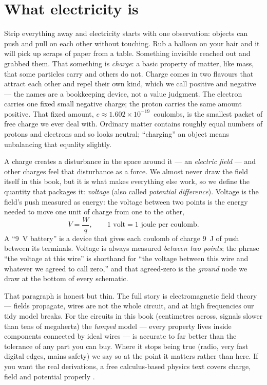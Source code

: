 \section{What electricity is}
\label{sec:charge}

Strip everything away and electricity starts with one observation: objects can
push and pull on each other without touching. Rub a balloon on your hair and it
will pick up scraps of paper from a table. Something invisible reached out and
grabbed them. That something is \emph{charge}: a basic
property of matter, like mass, that some particles carry and others do not.
Charge comes in two flavours that attract each other and repel their own kind,
which we call positive and negative — the names are a bookkeeping device, not a
value judgment. The electron carries one fixed small negative charge; the proton
carries the same amount positive. That fixed amount, $e \approx
1.602\times10^{-19}$~coulombs, is the smallest packet of free
charge we ever deal with. Ordinary matter contains roughly equal numbers of
protons and electrons and so looks neutral; ``charging'' an object means
unbalancing that equality slightly.

A charge creates a disturbance in the space around it — an \emph{electric
field} — and other charges feel that disturbance as
a force. We almost never draw the field itself in this book, but it is what
makes everything else work, so we define the quantity that packages it:
\emph{voltage} (also called \emph{potential
difference}). Voltage is the field's push measured
as energy: the voltage between two points is the energy needed to move one unit
of charge from one to the other,
\[
  V = \frac{W}{q}, \qquad \text{1 volt} = \text{1 joule per coulomb}.
\]
A ``\qty{9}{\volt} battery'' is a device that gives each coulomb of charge
\qty{9}{\joule} of push between its terminals. Voltage is always measured
\emph{between two points}; the phrase ``the voltage at this wire'' is shorthand
for ``the voltage between this wire and whatever we agreed to call zero,'' and
that agreed-zero is the \emph{ground} node we draw at the bottom
of every schematic.

\begin{remark}
That paragraph is honest but thin. The full story is electromagnetic field
theory — fields propagate, wires are not the whole circuit, and at high
frequencies our tidy model breaks. For the circuits in this book (centimetres
across, signals slower than tens of megahertz) the \emph{lumped} model — every
property lives inside components connected by ideal wires — is accurate to far
better than the tolerance of any part you can buy. Where it stops being true
(radio, very fast digital edges, mains safety) we say so at the point it matters
rather than here. If you want the real derivations, a free calculus-based
physics text covers charge, field and potential properly \cite{openstaxv2}.
\end{remark}

